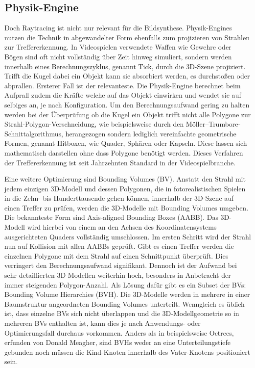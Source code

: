 \documentclass[11pt]{scrartcl}
\begin{document}
	\subsection{Physik-Engine}
	
	Doch Raytracing ist nicht nur relevant für die Bildsynthese. Physik-Engines nutzen die Technik in abgewandelter Form ebenfalls zum projizieren von Strahlen zur Treffererkennung. In Videospielen verwendete Waffen wie Gewehre oder Bögen sind oft nicht vollständig über Zeit hinweg simuliert, sondern werden innerhalb eines Berechnungszyklus, genannt Tick, durch die 3D-Szene projiziert. Trifft die Kugel dabei ein Objekt kann sie absorbiert werden, es durchstoßen oder abprallen. Ersterer Fall ist der relevanteste. Die Physik-Engine berechnet beim Aufprall zudem die Kräfte welche auf das Objekt einwirken und wendet sie auf selbiges an, je nach Konfiguration. Um den Berechnungsaufwand gering zu halten werden bei der Überprüfung ob die Kugel ein Objekt trifft nicht alle Polygone zur Strahl-Polygon-Verschneidung, wie beispielsweise durch den Möller–Trumbore-Schnittalgorithmus\cite{MoellerTrumbore1997}, herangezogen sondern lediglich vereinfachte geometrische Formen, genannt Hitboxen, wie Quader, Sphären oder Kapseln. Diese lassen sich mathematisch darstellen ohne dass Polygone benötigt werden\cite{Ericson2004}. Dieses Verfahren der Treffererkennung ist seit Jahrzehnten Standard in der Videospielbranche. 
	
	Eine weitere Optimierung sind Bounding Volumes (BV). Anstatt den Strahl mit jedem einzigen 3D-Modell und dessen Polygonen, die in fotorealistischen Spielen in die Zehn- bis Hunderttausende gehen können, innerhalb der 3D-Szene auf einen Treffer zu prüfen, werden die 3D-Modelle mit Bounding Volumes umgeben. Die bekannteste Form sind Axis-aligned Bounding Boxes (AABB). Das 3D-Modell wird hierbei von einem an den Achsen des Koordinatensystems ausgerichteten Quaders vollständig umschlossen. Im ersten Schritt wird der Strahl nun auf Kollision mit allen AABBs geprüft. Gibt es einen Treffer werden die einzelnen Polygone mit dem Strahl auf einen Schnittpunkt überprüft. Dies verringert den Berechnungsaufwand signifikant. Dennoch ist der Aufwand bei sehr detaillierten 3D-Modellen weiterhin hoch, besonders in Anbetracht der immer steigenden Polygon-Anzahl. Als Lösung dafür gibt es ein Subset der BVs: Bounding Volume Hierarchies (BVH). Die 3D-Modelle werden in mehrere in einer Baumstruktur angeordneten Bounding Volumes unterteilt. Wenngleich es üblich ist, dass einzelne BVs sich nicht überlappen und die 3D-Modellgeometrie so in mehreren BVs enthalten ist, kann dies je nach Anwendungs- oder Optimierungsfall durchaus vorkommen. Anders als in beispielsweise Octrees, erfunden von Donald Meagher\cite{Meagher1980}, sind BVHs weder an eine Unterteilungstiefe gebunden noch müssen die Kind-Knoten innerhalb des Vater-Knotens positioniert sein.\cite{Ericson2004}
	
\end{document}
